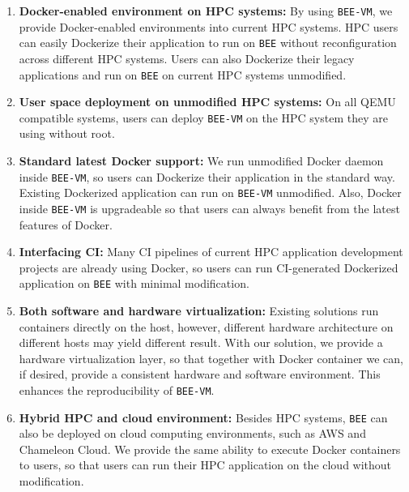 \begin{enumerate}
\item \textbf{Docker-enabled environment on HPC systems:}
By using \texttt{BEE-VM}, we provide Docker-enabled environments into current HPC systems. HPC users can easily Dockerize their application to run on \texttt{BEE} without reconfiguration across different HPC systems. Users can also Dockerize their legacy applications and run on \texttt{BEE} on current HPC systems unmodified.

\item \textbf{User space deployment on unmodified HPC systems:}
On all QEMU compatible systems, users can deploy \texttt{BEE-VM} on the HPC system they are using without root.

\item \textbf{Standard latest Docker support:}
We run unmodified Docker daemon inside \texttt{BEE-VM}, so users can Dockerize their application in the standard way. Existing Dockerized application can run on \texttt{BEE-VM} unmodified. Also, Docker inside \texttt{BEE-VM} is upgradeable so that users can always benefit from the latest features of Docker.

\item \textbf{Interfacing CI:}
Many CI pipelines of current HPC application development projects are already using Docker, so users can run CI-generated Dockerized application on \texttt{BEE} with minimal modification.

\item \textbf{Both software and hardware virtualization:}
Existing solutions run containers directly on the host, however, different hardware architecture on different hosts may yield different result. With our solution, we provide a hardware virtualization layer, so that together with Docker container we can, if desired, provide a consistent hardware and software environment. This enhances the reproducibility of \texttt{BEE-VM}.


\item \textbf{Hybrid HPC and cloud environment:}
Besides HPC systems, \texttt{BEE} can also be deployed on cloud computing environments, such as AWS and Chameleon Cloud. We provide the same ability to execute Docker containers to users, so that users can run their HPC application on the cloud without modification.

\begin{comment}
\item \textbf{Workflow integration:}
The containerized environment provided by \texttt{BEE} can greatly facilitate the HPC workflow integration without complicated application configurations. Different parts in the workflow can be packed in container and viewed as modules, so we can easily integrate different modules together to form the workflow we want using \texttt{BEE}.
\end{comment}


\end{enumerate}
